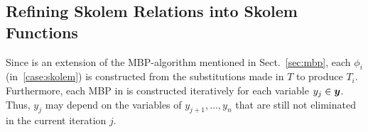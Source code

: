 \skolemcases


\subsection{Refining Skolem Relations into Skolem Functions}
\label{sec:new}

\localfactoralg


Since \aeval is an extension of the MBP-algorithm mentioned in Sect.~\ref{sec:mbp},
each $\phi_i$ (in~\eqref{case:skolem}) is constructed from the substitutions made in $T$ to produce $T_{i}$.
Furthermore, 
%
each MBP in \aeval is constructed iteratively for each variable $y_j \in \vy$.
Thus, $y_j$ may depend on the variables of $y_{j+1},\ldots, y_{n}$ that are still not eliminated in the current iteration $j$.

